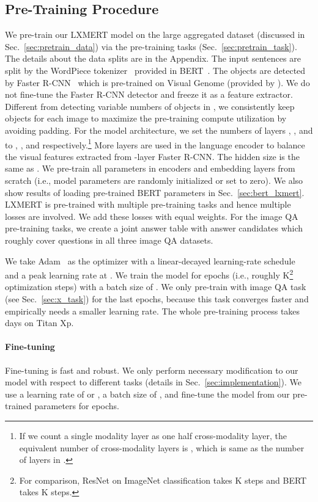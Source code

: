 \documentclass[11pt,a4paper]{article}
\newcommand\NL{ }
\newcommand\NX{ }
\newcommand\NR{  }
\begin{document}
\subsection{Pre-Training Procedure}
\label{sec:pretrain_procedure}
We pre-train our LXMERT model on the large aggregated dataset (discussed in Sec.~\ref{sec:pretrain_data}) via the pre-training tasks (Sec.~\ref{sec:pretrain_task}).
The details about the data splits are in the Appendix.
The input sentences are split by the WordPiece tokenizer~\cite{wu2016google} provided in BERT~\cite{devlin2018bert}.
The objects are detected by Faster R-CNN~\cite{ren2015faster} which is pre-trained on Visual Genome (provided by ).
We do not fine-tune the Faster R-CNN detector and freeze it as a feature extractor.
Different from detecting variable numbers of objects in , we consistently keep  objects for each image to maximize the pre-training compute utilization by avoiding padding.
For the model architecture, we set the numbers of layers \NL, \NX, and \NR to , , and  respectively.\footnote{If we count a single modality layer as one half cross-modality layer, the equivalent number of cross-modality layers is , which is same as the number of layers in .}
More layers are used in the language encoder to balance the visual features extracted from -layer Faster R-CNN.
The hidden size  is the same as .
We pre-train all parameters in encoders and embedding layers from scratch
(i.e., model parameters are randomly initialized or set to zero). 
We also show results of loading pre-trained BERT parameters in Sec.~\ref{sec:bert_lxmert}.
LXMERT is pre-trained with multiple pre-training tasks and hence multiple losses are involved.
We add these losses with equal weights.
For the image QA pre-training tasks, we create a joint answer table with  answer candidates which roughly cover  questions in all three image QA datasets.

We take Adam~\cite{kingma2014adam} as the optimizer with a linear-decayed learning-rate schedule~\cite{devlin2018bert} and a peak learning rate at .
We train the model for  epochs (i.e., roughly K\footnote{For comparison, ResNet on ImageNet classification takes K steps and BERT takes K steps.} optimization steps) with a batch size of .
We only pre-train with image QA task (see Sec.~\ref{sec:x_task}) for the last  epochs, because this task converges faster and empirically needs a smaller learning rate. 
The whole pre-training process takes  days on  Titan Xp.
\paragraph{Fine-tuning}
Fine-tuning is fast and robust.
We only perform necessary modification to our model with respect to different tasks (details in Sec.~\ref{sec:implementation}).
We use a learning rate of  or , a batch size of , and fine-tune the model from our pre-trained parameters for  epochs.
\end{document}
